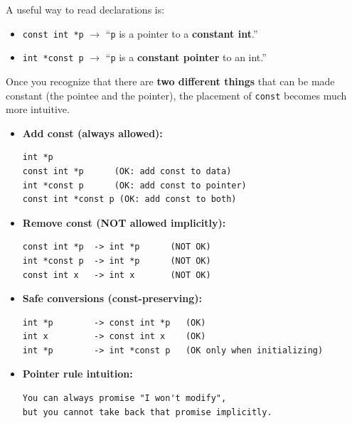 \documentclass[10pt]{article}
\newcommand{\pbreak}{\vspace{30pt}}
\begin{document}
A useful way to read declarations is:

\begin{itemize}
    \item \verb|const int *p| \quad $\rightarrow$ \quad ``\verb|p| is a pointer to a \textbf{constant int}.''
    \item \verb|int *const p| \quad $\rightarrow$ \quad ``\verb|p| is a \textbf{constant pointer} to an int.''
\end{itemize}

Once you recognize that there are \textbf{two different things} that can be made constant (the pointee and the pointer), the placement of \verb|const| becomes much more intuitive.

\pbreak

\begin{itemize}
    \item \textbf{Add const (always allowed):}
    \begin{verbatim}
int *p
const int *p      (OK: add const to data)
int *const p      (OK: add const to pointer)
const int *const p (OK: add const to both)
    \end{verbatim}

    \item \textbf{Remove const (NOT allowed implicitly):}
    \begin{verbatim}
const int *p  -> int *p      (NOT OK)
int *const p  -> int *p      (NOT OK)
const int x   -> int x       (NOT OK)
    \end{verbatim}

    \item \textbf{Safe conversions (const-preserving):}
    \begin{verbatim}
int *p        -> const int *p   (OK)
int x         -> const int x    (OK)
int *p        -> int *const p   (OK only when initializing)
    \end{verbatim}

    \item \textbf{Pointer rule intuition:}
    \begin{verbatim}
You can always promise "I won't modify",
but you cannot take back that promise implicitly.
    \end{verbatim}
\end{itemize}

\newpage
\end{document}
